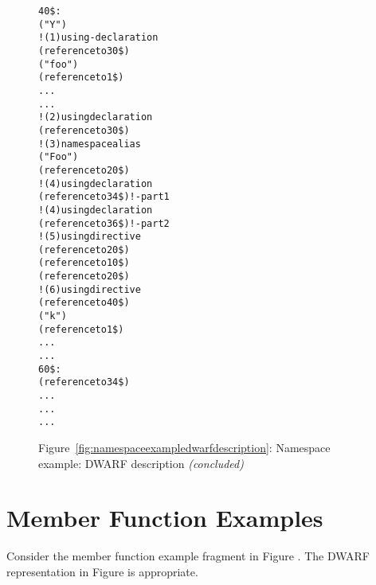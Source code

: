 \begin{figure}
\begin{dwflisting}
\begin{alltt}
40\$: \DWTAGnamespace
        \DWATname("Y")
        \DWTAGimporteddeclaration            ! (1) using-declaration
            \DWATimport(reference to 30\$)
        \DWTAGvariable
            \DWATname("foo")
            \DWATtype(reference to 1\$)
            \DWATlocation ...
            ...
     \DWTAGimporteddeclaration               ! (2) using declaration
        \DWATimport(reference to 30\$)
        \DWTAGimporteddeclaration            ! (3) namespace alias
            \DWATname("Foo")
            \DWATimport(reference to 20\$)
        \DWTAGimporteddeclaration            ! (4) using declaration
            \DWATimport(reference to 34\$)     !     - part 1
        \DWTAGimporteddeclaration            ! (4) using declaration
            \DWATimport(reference to 36\$)     !     - part 2
        \DWTAGimportedmodule                 ! (5) using directive
            \DWATimport(reference to 20\$)
        \DWTAGnamespace
            \DWATextension(reference to 10\$)
            \DWTAGnamespace
                \DWATextension(reference to 20\$)
                \DWTAGimportedmodule         ! (6) using directive
                    \DWATimport(reference to 40\$)
                \DWTAGvariable
                    \DWATname("k")
                    \DWATtype(reference to 1\$)
                    \DWATlocation ...
                    ...
60\$: \DWTAGsubprogram
        \DWATspecification(reference to 34\$)
        \DWATlowpc ...
        \DWAThighpc ...
        ...
\end{alltt}
\end{dwflisting}
\begin{center}
\vspace{3mm}
Figure~\ref{fig:namespaceexampledwarfdescription}: Namespace example: DWARF description \textit{(concluded)}
\end{center}
\end{figure}

\clearpage
\section{Member Function Examples}
\label{app:memberfunctionexample}
Consider the member function example fragment in 
Figure .
The DWARF representation in 
Figure 
is appropriate.

